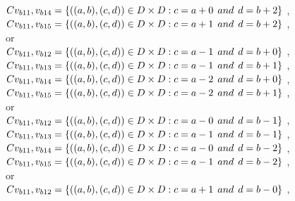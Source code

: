 \\$C{v_{b11},v_{b14}}=\{((a,b),(c,d))\in D\times D: c = a + 0\hspace{1ex} and \hspace{1ex}  d = b + 2 \}$ , 
\\$C{v_{b11},v_{b15}}=\{((a,b),(c,d))\in D\times D: c = a + 1\hspace{1ex} and \hspace{1ex}  d = b + 2 \}$ , 
\\or
\\$C{v_{b11},v_{b12}}=\{((a,b),(c,d))\in D\times D: c = a - 1\hspace{1ex} and \hspace{1ex}  d = b + 0 \}$ , 
\\$C{v_{b11},v_{b13}}=\{((a,b),(c,d))\in D\times D: c = a - 1\hspace{1ex} and \hspace{1ex}  d = b + 1 \}$ , 
\\$C{v_{b11},v_{b14}}=\{((a,b),(c,d))\in D\times D: c = a - 2\hspace{1ex} and \hspace{1ex}  d = b + 0 \}$ , 
\\$C{v_{b11},v_{b15}}=\{((a,b),(c,d))\in D\times D: c = a - 2\hspace{1ex} and \hspace{1ex}  d = b + 1 \}$ , 
\\or
\\$C{v_{b11},v_{b12}}=\{((a,b),(c,d))\in D\times D: c = a - 0\hspace{1ex} and \hspace{1ex}  d = b - 1 \}$ , 
\\$C{v_{b11},v_{b13}}=\{((a,b),(c,d))\in D\times D: c = a - 1\hspace{1ex} and \hspace{1ex}  d = b - 1 \}$ , 
\\$C{v_{b11},v_{b14}}=\{((a,b),(c,d))\in D\times D: c = a - 0\hspace{1ex} and \hspace{1ex}  d = b - 2 \}$ , 
\\$C{v_{b11},v_{b15}}=\{((a,b),(c,d))\in D\times D: c = a - 1\hspace{1ex} and \hspace{1ex}  d = b - 2 \}$ , 
\\or
\\$C{v_{b11},v_{b12}}=\{((a,b),(c,d))\in D\times D: c = a + 1\hspace{1ex} and \hspace{1ex}  d = b - 0 \}$ , 
